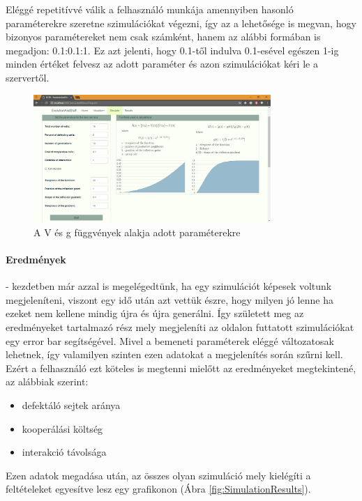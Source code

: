 Eléggé repetitívvé válik a felhasználó munkája amennyiben hasonló paraméterekre szeretne szimulációkat végezni, így az a lehetősége is megvan, hogy bizonyos paramétereket nem csak számként, hanem az alábbi formában is megadjon: 0.1:0.1:1. Ez azt jelenti, hogy 0.1-től indulva 0.1-esével egészen 1-ig minden értéket felvesz az adott paraméter és azon szimulációkat kéri le a szervertől.

\begin{figure}[ht!]
	\centering
	\includegraphics[width=90mm]{images/SimulationFunctionDiagrams}
	\vspace*{1mm}
	\caption{A V és g függvények alakja adott paraméterekre}
	\label{fig:SimulationFunctionDiagrams}
\end{figure}


\paragraph{Eredmények}- kezdetben már azzal is megelégedtünk, ha egy szimulációt képesek voltunk megjeleníteni, viszont egy idő után azt vettük észre, hogy milyen jó lenne ha ezeket nem kellene mindig újra és újra generálni. Így született meg az eredményeket tartalmazó rész mely megjeleníti az oldalon futtatott szimulációkat egy error bar segítségével. Mivel a bemeneti paraméterek eléggé változatosak lehetnek, így valamilyen szinten ezen adatokat a megjelenítés során szűrni kell. Ezért a felhasználó ezt köteles is megtenni mielőtt az eredményeket megtekintené, az alábbiak szerint:
\begin{itemize}
	\item defektáló sejtek aránya
	\item kooperálási költség 
	\item interakció távolsága
\end{itemize}
Ezen adatok megadása után, az összes olyan szimuláció mely kielégíti a feltételeket egyesítve lesz egy grafikonon (Ábra \ref{fig:SimulationResults}).

